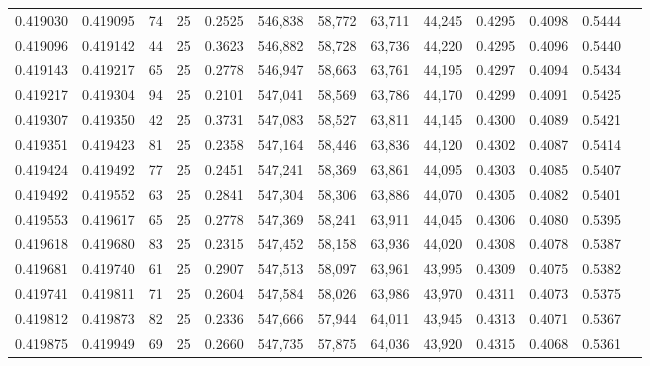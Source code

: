 \begin{tabular}{rrrrrrrrrrrrr}
0.419030 & 0.419095 &    74 &  25 &                                     0.2525 & 546,838 &  58,772 &  63,711 &  44,245 & 0.4295 & 0.4098 & 0.5444 \\
0.419096 & 0.419142 &    44 &  25 &                                     0.3623 & 546,882 &  58,728 &  63,736 &  44,220 & 0.4295 & 0.4096 & 0.5440 \\
0.419143 & 0.419217 &    65 &  25 &                                     0.2778 & 546,947 &  58,663 &  63,761 &  44,195 & 0.4297 & 0.4094 & 0.5434 \\
0.419217 & 0.419304 &    94 &  25 &                                     0.2101 & 547,041 &  58,569 &  63,786 &  44,170 & 0.4299 & 0.4091 & 0.5425 \\
0.419307 & 0.419350 &    42 &  25 &                                     0.3731 & 547,083 &  58,527 &  63,811 &  44,145 & 0.4300 & 0.4089 & 0.5421 \\
0.419351 & 0.419423 &    81 &  25 &                                     0.2358 & 547,164 &  58,446 &  63,836 &  44,120 & 0.4302 & 0.4087 & 0.5414 \\
0.419424 & 0.419492 &    77 &  25 &                                     0.2451 & 547,241 &  58,369 &  63,861 &  44,095 & 0.4303 & 0.4085 & 0.5407 \\
0.419492 & 0.419552 &    63 &  25 &                                     0.2841 & 547,304 &  58,306 &  63,886 &  44,070 & 0.4305 & 0.4082 & 0.5401 \\
0.419553 & 0.419617 &    65 &  25 &                                     0.2778 & 547,369 &  58,241 &  63,911 &  44,045 & 0.4306 & 0.4080 & 0.5395 \\
0.419618 & 0.419680 &    83 &  25 &                                     0.2315 & 547,452 &  58,158 &  63,936 &  44,020 & 0.4308 & 0.4078 & 0.5387 \\
0.419681 & 0.419740 &    61 &  25 &                                     0.2907 & 547,513 &  58,097 &  63,961 &  43,995 & 0.4309 & 0.4075 & 0.5382 \\
0.419741 & 0.419811 &    71 &  25 &                                     0.2604 & 547,584 &  58,026 &  63,986 &  43,970 & 0.4311 & 0.4073 & 0.5375 \\
0.419812 & 0.419873 &    82 &  25 &                                     0.2336 & 547,666 &  57,944 &  64,011 &  43,945 & 0.4313 & 0.4071 & 0.5367 \\
0.419875 & 0.419949 &    69 &  25 &                                     0.2660 & 547,735 &  57,875 &  64,036 &  43,920 & 0.4315 & 0.4068 & 0.5361 \\

\end{tabular}
